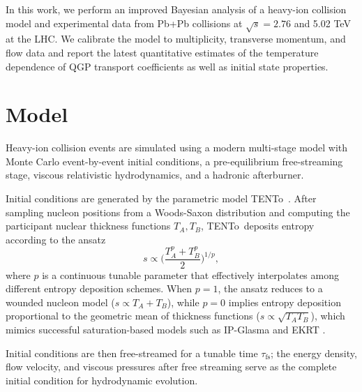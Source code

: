 \documentclass[3p,times,procedia,sort&compress]{elsarticle}
\newcommand{\trento}{T\raisebox{-0.5ex}{R}ENTo}
\begin{document}
In this work, we perform an improved Bayesian analysis of a heavy-ion collision model and experimental data from Pb+Pb collisions at $\sqrt s = 2.76$ and 5.02 TeV at the LHC.
We calibrate the model to multiplicity, transverse momentum, and flow data and report the latest quantitative estimates of the temperature dependence of QGP transport coefficients as well as initial state properties.


\section{Model}

Heavy-ion collision events are simulated using a modern multi-stage model with Monte Carlo event-by-event initial conditions, a pre-equilibrium free-streaming stage, viscous relativistic hydrodynamics, and a hadronic afterburner.

Initial conditions are generated by the parametric model \trento\ \cite{Moreland:2014oya, Bernhard:2016tnd}.
After sampling nucleon positions from a Woods-Saxon distribution and computing the participant nuclear thickness functions $T_A,T_B$, \trento\ deposits entropy according to the ansatz
\begin{equation}
  s \propto \Biggl( \frac{T_A^p + T_B^p}{2} \Biggr)^{1/p},
  \label{eq:trento}
\end{equation}
where $p$ is a continuous tunable parameter that effectively interpolates among different entropy deposition schemes.
When $p = 1$, the ansatz reduces to a wounded nucleon model ($s \propto T_A + T_B$), while $p = 0$ implies entropy deposition proportional to the geometric mean of thickness functions ($s \propto \sqrt{T_AT_B}$), which mimics successful saturation-based models such as IP-Glasma \cite{Schenke:2012wb} and EKRT \cite{Niemi:2015qia}.

Initial conditions are then free-streamed \cite{Liu:2015nwa} for a tunable time $\tau_\text{fs}$;
the energy density, flow velocity, and viscous pressures after free streaming serve as the complete initial condition for hydrodynamic evolution.
\end{document}
